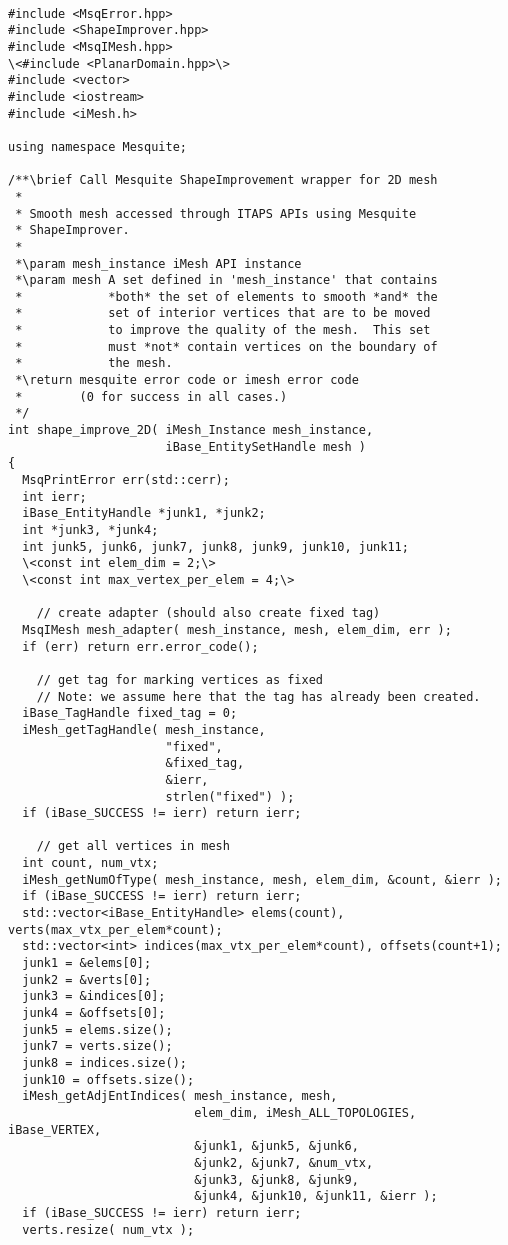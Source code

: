 \begin{lstlisting}

#include <MsqError.hpp>
#include <ShapeImprover.hpp>
#include <MsqIMesh.hpp>
\<#include <PlanarDomain.hpp>\>
#include <vector>
#include <iostream>
#include <iMesh.h>

using namespace Mesquite;

/**\brief Call Mesquite ShapeImprovement wrapper for 2D mesh
 *
 * Smooth mesh accessed through ITAPS APIs using Mesquite
 * ShapeImprover.
 *
 *\param mesh_instance iMesh API instance
 *\param mesh A set defined in 'mesh_instance' that contains
 *            *both* the set of elements to smooth *and* the
 *            set of interior vertices that are to be moved
 *            to improve the quality of the mesh.  This set
 *            must *not* contain vertices on the boundary of
 *            the mesh.
 *\return mesquite error code or imesh error code
 *        (0 for success in all cases.)
 */
int shape_improve_2D( iMesh_Instance mesh_instance,
                      iBase_EntitySetHandle mesh )
{
  MsqPrintError err(std::cerr);
  int ierr;
  iBase_EntityHandle *junk1, *junk2;
  int *junk3, *junk4;
  int junk5, junk6, junk7, junk8, junk9, junk10, junk11;
  \<const int elem_dim = 2;\>
  \<const int max_vertex_per_elem = 4;\>
  
    // create adapter (should also create fixed tag)
  MsqIMesh mesh_adapter( mesh_instance, mesh, elem_dim, err );
  if (err) return err.error_code();

    // get tag for marking vertices as fixed
    // Note: we assume here that the tag has already been created.
  iBase_TagHandle fixed_tag = 0;
  iMesh_getTagHandle( mesh_instance,
                      "fixed",
                      &fixed_tag,
                      &ierr,
                      strlen("fixed") );
  if (iBase_SUCCESS != ierr) return ierr;

    // get all vertices in mesh
  int count, num_vtx;
  iMesh_getNumOfType( mesh_instance, mesh, elem_dim, &count, &ierr );
  if (iBase_SUCCESS != ierr) return ierr;
  std::vector<iBase_EntityHandle> elems(count), verts(max_vtx_per_elem*count);
  std::vector<int> indices(max_vtx_per_elem*count), offsets(count+1);
  junk1 = &elems[0];
  junk2 = &verts[0];
  junk3 = &indices[0];
  junk4 = &offsets[0];
  junk5 = elems.size();
  junk7 = verts.size();
  junk8 = indices.size();
  junk10 = offsets.size();
  iMesh_getAdjEntIndices( mesh_instance, mesh, 
                          elem_dim, iMesh_ALL_TOPOLOGIES, iBase_VERTEX,
                          &junk1, &junk5, &junk6,
                          &junk2, &junk7, &num_vtx,
                          &junk3, &junk8, &junk9,
                          &junk4, &junk10, &junk11, &ierr );
  if (iBase_SUCCESS != ierr) return ierr;
  verts.resize( num_vtx );


\end{lstlisting}
